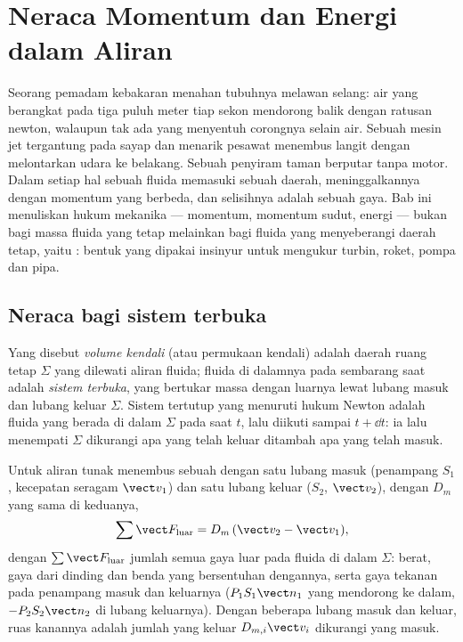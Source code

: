 \chapter{Neraca Momentum dan Energi dalam Aliran}\label{ch:b2:flow-balances}

Seorang pemadam kebakaran menahan tubuhnya melawan selang: air yang
berangkat pada tiga puluh meter tiap sekon mendorong balik dengan ratusan
newton, walaupun tak ada yang menyentuh corongnya selain air. Sebuah mesin
jet tergantung pada sayap dan menarik pesawat menembus langit dengan
melontarkan udara ke belakang. Sebuah penyiram taman berputar tanpa motor.
Dalam setiap hal sebuah fluida memasuki sebuah daerah, meninggalkannya
dengan momentum yang berbeda, dan selisihnya adalah sebuah gaya. Bab ini
menuliskan hukum mekanika --- momentum, momentum sudut, energi --- bukan
bagi massa fluida yang tetap melainkan bagi fluida yang menyeberangi
daerah tetap, yaitu \emph{}: bentuk yang dipakai insinyur
untuk mengukur turbin, roket, pompa dan pipa.

\section{Neraca bagi sistem terbuka}

\begin{definition}\label{def:b2:flow-balances:cv}
Yang disebut \emph{volume kendali} (atau permukaan kendali) adalah daerah
ruang tetap $\Sigma$ yang dilewati aliran fluida; fluida di dalamnya pada
sembarang saat adalah \emph{sistem terbuka}, yang bertukar massa dengan
luarnya lewat lubang masuk dan lubang keluar $\Sigma$. Sistem tertutup
yang menuruti hukum Newton adalah fluida yang berada di dalam $\Sigma$
pada saat $t$, lalu diikuti sampai $t + \dd t$: ia lalu menempati $\Sigma$
dikurangi apa yang telah keluar ditambah apa yang telah masuk.
\end{definition}

\begin{theorem}\label{thm:b2:flow-balances:momentum}
Untuk aliran tunak menembus sebuah  dengan satu lubang
masuk (penampang $S_1$, kecepatan seragam $\vect v_1$) dan satu lubang
keluar ($S_2$, $\vect v_2$), dengan  $D_m$ yang sama di keduanya,
\[
\sum\vect F_{\text{luar}} = D_m\,(\vect v_2 - \vect v_1) ,
\]
dengan $\sum\vect F_{\text{luar}}$ jumlah semua gaya luar pada
fluida di dalam $\Sigma$: berat, gaya dari dinding dan benda yang
bersentuhan dengannya, serta gaya tekanan pada penampang masuk dan
keluarnya ($P_1S_1\vect n_1$ yang mendorong ke dalam, $-P_2S_2\vect n_2$ di lubang keluarnya). Dengan
beberapa lubang masuk dan keluar, ruas kanannya adalah jumlah  yang keluar $D_{m,i}\vect v_i$ dikurangi yang masuk.
\end{theorem}

